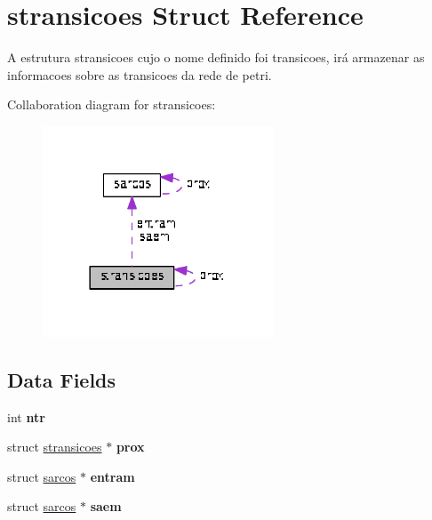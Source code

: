 \hypertarget{structstransicoes}{\section{stransicoes Struct Reference}
\label{structstransicoes}
}



\begin{DoxyItemize}
\item A estrutura stransicoes cujo o nome definido foi transicoes, irá armazenar as informacoes sobre as transicoes da rede de petri. 
\end{DoxyItemize} 




Collaboration diagram for stransicoes\+:\nopagebreak
\begin{figure}[H]
\begin{center}
\leavevmode
\includegraphics[width=194pt]{structstransicoes__coll__graph}
\end{center}
\end{figure}
\subsection*{Data Fields}
\begin{DoxyCompactItemize}
\item 
\hypertarget{structstransicoes_ae97cbc2aefd98500d0926dcee3dc7ba9}{int {\bfseries ntr}}\label{structstransicoes_ae97cbc2aefd98500d0926dcee3dc7ba9}

\item 
\hypertarget{structstransicoes_a9b6d3aa4b419f4d1def1fd28bd056d6c}{struct \hyperlink{structstransicoes}{stransicoes} $\ast$ {\bfseries prox}}\label{structstransicoes_a9b6d3aa4b419f4d1def1fd28bd056d6c}

\item 
\hypertarget{structstransicoes_a45642aa4189a4c998f2cb6ba0bfbee28}{struct \hyperlink{structsarcos}{sarcos} $\ast$ {\bfseries entram}}\label{structstransicoes_a45642aa4189a4c998f2cb6ba0bfbee28}

\item 
\hypertarget{structstransicoes_a9dc5695ede661e803acfade92ed9f34d}{struct \hyperlink{structsarcos}{sarcos} $\ast$ {\bfseries saem}}\label{structstransicoes_a9dc5695ede661e803acfade92ed9f34d}

\end{DoxyCompactItemize}


